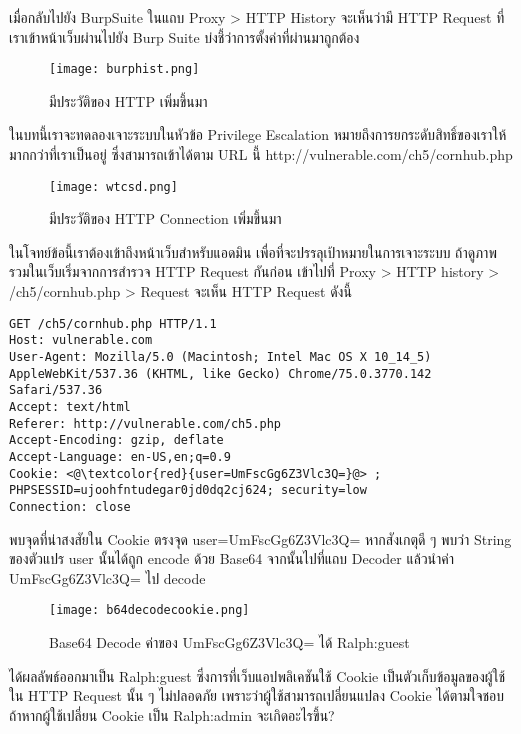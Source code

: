 เมื่อกลับไปยัง BurpSuite ในแถบ Proxy > HTTP History  จะเห็นว่ามี HTTP Request ที่เราเข้าหน้าเว็บผ่านไปยัง Burp Suite บ่งชี้ว่าการตั้งค่าที่ผ่านมาถูกต้อง

\begin{figure}[h]
	\centering
	\texttt{[image: burphist.png]}
	\caption{มีประวัติของ HTTP เพิ่มขึ้นมา}
	\label{Fig:burphist.png}
\end{figure}

ในบทนี้เราจะทดลองเจาะระบบในหัวข้อ Privilege Escalation หมายถึงการยกระดับสิทธิ์ของเราให้มากกว่าที่เราเป็นอยู่ ซึ่งสามารถเข้าได้ตาม URL นี้ http://vulnerable.com/ch5/cornhub.php 

\begin{figure}[h]
	\centering
	\texttt{[image: wtcsd.png]}
	\caption{มีประวัติของ HTTP Connection เพิ่มขึ้นมา}
	\label{Fig:wtcsd.png}
\end{figure}

ในโจทย์ข้อนี้เราต้องเข้าถึงหน้าเว็บสำหรับแอดมิน เพื่อที่จะปรรลุเป้าหมายในการเจาะระบบ ถ้าดูภาพรวมในเว็บเริ่มจากการสำรวจ HTTP Request กันก่อน เข้าไปที่ Proxy > HTTP history > /ch5/cornhub.php > Request จะเห็น HTTP Request ดังนี้

\begin{lstlisting}[numbers=none] 
GET /ch5/cornhub.php HTTP/1.1
Host: vulnerable.com
User-Agent: Mozilla/5.0 (Macintosh; Intel Mac OS X 10_14_5) AppleWebKit/537.36 (KHTML, like Gecko) Chrome/75.0.3770.142 Safari/537.36
Accept: text/html
Referer: http://vulnerable.com/ch5.php
Accept-Encoding: gzip, deflate
Accept-Language: en-US,en;q=0.9
Cookie: <@\textcolor{red}{user=UmFscGg6Z3Vlc3Q=}@> ; PHPSESSID=ujoohfntudegar0jd0dq2cj624; security=low
Connection: close
\end{lstlisting}

พบจุดที่น่าสงสัยใน Cookie ตรงจุด user=UmFscGg6Z3Vlc3Q= หากสังเกตุดี ๆ พบว่า String ของตัวแปร user นั้นได้ถูก encode ด้วย Base64 จากนั้นไปที่แถบ Decoder แล้วนำค่า UmFscGg6Z3Vlc3Q= ไป decode

\begin{figure}[h!]
	\centering
	\texttt{[image: b64decodecookie.png]}
	\caption{Base64 Decode ค่าของ UmFscGg6Z3Vlc3Q= ได้ Ralph:guest}
	\label{Fig:b64decodecookie.png}
\end{figure}

ได้ผลลัพธ์ออกมาเป็น Ralph:guest ซึ่งการที่เว็บแอปพลิเคชันใช้ Cookie เป็นตัวเก็บข้อมูลของผู้ใช้ใน HTTP Request นั้น ๆ ไม่ปลอดภัย เพราะว่าผู้ใช้สามารถเปลี่ยนแปลง Cookie ได้ตามใจชอบ ถ้าหากผู้ใช้เปลี่ยน Cookie เป็น Ralph:admin จะเกิดอะไรขึ้น?


